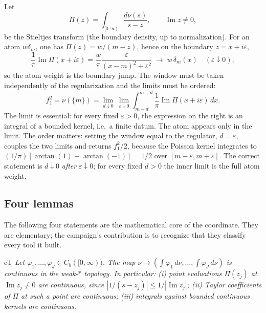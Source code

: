 Let
\begin{equation}
\Pi(z)=\int_{[0,\infty)}\frac{d\nu(s)}{s-z},\qquad \operatorname{Im}z\ne0 ,
\label{eq:stieltjes}
\end{equation}
be the Stieltjes transform (the boundary density, up to normalization). For an atom
$w\delta_m$, one has $\Pi(z)=w/(m-z)$, hence on the boundary $z=x+i\varepsilon$,
\begin{equation}
\frac{1}{\pi}\operatorname{Im}\Pi(x+i\varepsilon)
=\frac{w}{\pi}\frac{\varepsilon}{(x-m)^2+\varepsilon^2}
\;\longrightarrow\; w\,\delta_m(x)\quad(\varepsilon\downarrow0),
\label{eq:atomjump}
\end{equation}
so the atom weight is the boundary jump. The window must be taken independently of the
regularization and the limits must be ordered:
\begin{equation}
f_1^2=\nu(\{m\})=\lim_{d\downarrow0}\ \lim_{\varepsilon\downarrow0}
\int_{m-d}^{m+d}\frac{1}{\pi}\operatorname{Im}\Pi(x+i\varepsilon)\,dx .
\label{eq:atomweight}
\end{equation}
The limit is essential: for every fixed $\varepsilon>0$, the expression on the right is an
integral of a bounded kernel, i.e.\ a finite datum. The atom appears only in the limit.
The order matters: setting the window equal to the regulator, $d=\varepsilon$, couples the two
limits and returns $f_1^2/2$, because the Poisson kernel integrates to
$(1/\pi)[\arctan(1)-\arctan(-1)]=1/2$ over $[m-\varepsilon,m+\varepsilon]$. The correct statement
is $d\downarrow0$ \emph{after} $\varepsilon\downarrow0$; for every fixed $d>0$ the inner limit is
the full atom weight.

\subsection{Four lemmas}

The following four statements are the mathematical core of the coordinate. They are elementary;
the campaign's contribution is to recognize that they classify every tool it built.

\begin{claimbox}{cT}
 \emph{Let $\varphi_1,\dots,\varphi_J\in
C_b([0,\infty))$. The map $\nu\mapsto(\int\varphi_1\,d\nu,\dots,\int\varphi_J\,d\nu)$ is
continuous in the weak-$*$ topology. In particular: (i) point evaluations $\Pi(z_j)$ at
$\operatorname{Im}z_j\ne0$ are continuous, since $|1/(s-z_j)|\le1/|\operatorname{Im}z_j|$;
(ii) Taylor coefficients of $\Pi$ at such a point are continuous; (iii) integrals against
bounded continuous kernels are continuous.}
\end{claimbox}

